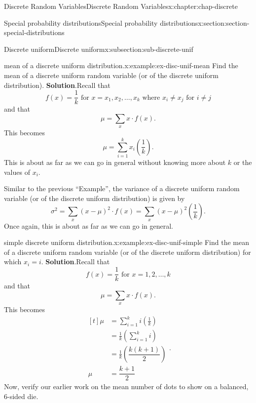\documentclass[oneside,10pt,]{book}
\newcommand{\blocktitlefont}{\relax}
\numberwithin{equation}{section}
\newcommand{\amp}{&}
\begin{document}
\begin{chapterptx}{Discrete Random Variables}{}{Discrete Random Variables}{}{}{x:chapter:chap-discrete}
\begin{sectionptx}{Special probability distributions}{}{Special probability distributions}{}{}{x:section:section-special-distributions}
\begin{subsectionptx}{Discrete uniform}{}{Discrete uniform}{}{}{x:subsection:sub-discrete-unif}
\begin{example}{mean of a discrete uniform distribution.}{x:example:ex-disc-unif-mean}
Find the mean of a discrete uniform random variable (or of the discrete uniform distribution).%
\textbf{\blocktitlefont Solution}.\quad{}Recall that%
\begin{equation*}
f(x) = \frac{1}{k} \text{ for } x = x_1, x_2, \dots,
x_k \text{ where }x_i\ne x_j \text{ for } i \ne j
\end{equation*}
and that%
\begin{equation*}
\mu
= \sum_x x\cdot f(x)\text{.}
\end{equation*}
This becomes%
\begin{equation*}
\mu = \sum_{i=1}^k
x_i\left(\frac{1}{k}\right)\text{.}
\end{equation*}
This is about as far as we can go in general without knowing more about \(k\) or the values of \(x_i\).%
\end{example}
Similar to the previous ``Example'', the variance of a discrete uniform random variable (or of the discrete uniform distribution) is given by%
\begin{equation*}
\sigma^2 = \sum_x (x-\mu)^2\cdot f(x)= \sum_x (x-\mu)^2
\left(\frac{1}{k}\right)\text{.}
\end{equation*}
Once again, this is about as far as we can go in general.%
\begin{example}{simple discrete uniform distribution.}{x:example:ex-disc-unif-simple}%
Find the mean of a discrete uniform random variable (or of the discrete uniform distribution) for which \(x_i = i\).%
\textbf{\blocktitlefont Solution}.\quad{}Recall that%
\begin{equation*}
f(x) = \frac{1}{k} \text{ for } x = 1, 2, \dots,
k
\end{equation*}
and that%
\begin{equation*}
\mu = \sum_x x\cdot f(x)\text{.}
\end{equation*}
This becomes%
\begin{equation*}
\begin{aligned}[t]
\mu \amp = \sum_{i=1}^k i\left(\frac{1}{k}\right)\\
\amp = \frac{1}{k}\left(\sum_{i=1}^k i\right)\\
\amp = \frac{1}{k}\left(\dfrac{k(k+1)}{2}\right)\\
\mu	\amp = \dfrac{k+1}{2}
\end{aligned}\text{.}
\end{equation*}
Now, verify our earlier work on the mean number of dots to show on a balanced, 6-sided die.%
\end{example}
\end{subsectionptx}

\end{sectionptx}
\end{chapterptx}
\end{document}
